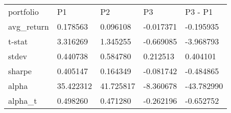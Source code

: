 \begin{tabular}{lllll}
\toprule
\midrule
portfolio & P1 & P2 & P3 & P3 - P1 \\
avg_return & 0.178563 & 0.096108 & -0.017371 & -0.195935 \\
t-stat & 3.316269 & 1.345255 & -0.669085 & -3.968793 \\
stdev & 0.440738 & 0.584780 & 0.212513 & 0.404101 \\
sharpe & 0.405147 & 0.164349 & -0.081742 & -0.484865 \\
alpha & 35.422312 & 41.725817 & -8.360678 & -43.782990 \\
alpha_t & 0.498260 & 0.471280 & -0.262196 & -0.652752 \\
\bottomrule
\end{tabular}
